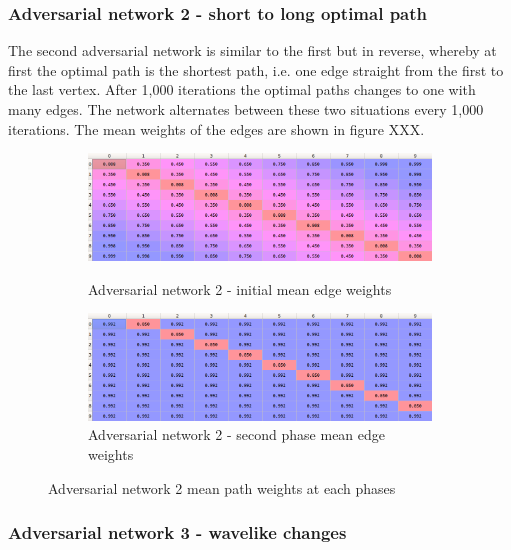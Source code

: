 \subsubsection{Adversarial network 2 - short to long optimal path}

The second adversarial network is similar to the first but in reverse, whereby at first the optimal path is the shortest path, i.e. one edge straight from the first to the last vertex. After 1,000 iterations the optimal paths changes to one with many edges. The network alternates between these two situations every 1,000 iterations. The mean weights of the edges are shown in figure XXX.\\

\begin{figure}[h!]
\centering
\begin{subfigure}{1.0\textwidth}
  \centering
  \includegraphics[width=14cm]{../plots/path_means3.png}
  \caption{Adversarial network 2 - initial mean edge weights}
  \label{}
  \includegraphics[width=14cm]{../plots/path_means4.png}
  \caption{Adversarial network 2 - second phase mean edge weights}
  \label{}
\end{subfigure}
\caption{Adversarial network 2 mean path weights at each phases}
\label{fig:ullm-particle}
\end{figure}



\subsubsection{Adversarial network 3 - wavelike changes}

